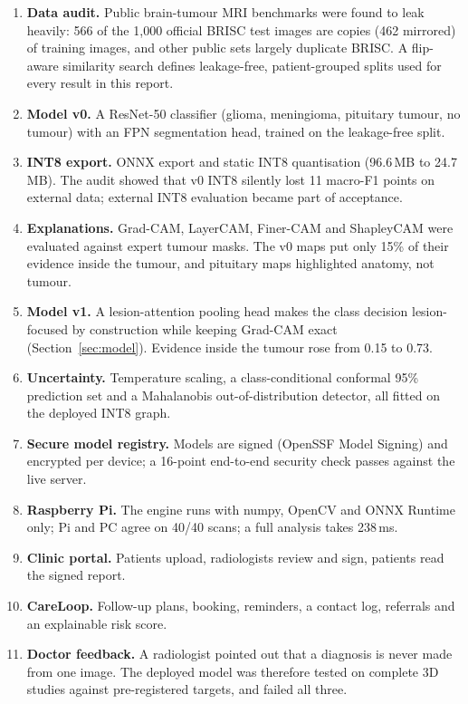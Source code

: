 \documentclass[11pt,a4paper]{article}
\begin{document}
\begin{enumerate}[label=\textbf{\arabic*.}]
\item \textbf{Data audit.} Public brain-tumour MRI benchmarks were found to leak heavily: 566 of the 1{,}000 official
BRISC test images are copies (462 mirrored) of training images, and other public sets largely duplicate BRISC. A
flip-aware similarity search defines leakage-free, patient-grouped splits used for every result in this report.
\item \textbf{Model v0.} A ResNet-50 classifier (glioma, meningioma, pituitary tumour, no tumour) with an FPN
segmentation head, trained on the leakage-free split.
\item \textbf{INT8 export.} ONNX export and static INT8 quantisation (96.6\,MB to 24.7\,MB). The audit showed that
v0 INT8 silently lost 11 macro-F1 points on external data; external INT8 evaluation became part of acceptance.
\item \textbf{Explanations.} Grad-CAM, LayerCAM, Finer-CAM and ShapleyCAM were evaluated against expert tumour masks.
The v0 maps put only 15\% of their evidence inside the tumour, and pituitary maps highlighted anatomy, not tumour.
\item \textbf{Model v1.} A lesion-attention pooling head makes the class decision lesion-focused by construction while
keeping Grad-CAM exact (Section~\ref{sec:model}). Evidence inside the tumour rose from 0.15 to 0.73.
\item \textbf{Uncertainty.} Temperature scaling, a class-conditional conformal 95\% prediction set and a Mahalanobis
out-of-distribution detector, all fitted on the deployed INT8 graph.
\item \textbf{Secure model registry.} Models are signed (OpenSSF Model Signing) and encrypted per device; a 16-point
end-to-end security check passes against the live server.
\item \textbf{Raspberry Pi.} The engine runs with numpy, OpenCV and ONNX Runtime only; Pi and PC agree on 40/40
scans; a full analysis takes 238\,ms.
\item \textbf{Clinic portal.} Patients upload, radiologists review and sign, patients read the signed report.
\item \textbf{CareLoop.} Follow-up plans, booking, reminders, a contact log, referrals and an explainable risk score.
\item \textbf{Doctor feedback.} A radiologist pointed out that a diagnosis is never made from one image. The deployed
model was therefore tested on complete 3D studies against pre-registered targets, and failed all three.

\end{enumerate}
\end{document}
